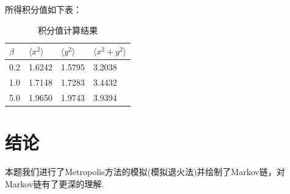 \documentclass[12pt,a4paper,utf8]{ctexart}
\begin{document}
\begin{itemize}
    所得积分值如下表：
\begin{table}[!h]
\centering
\caption{积分值计算结果}
\begin{tabular}{|l|l|l|l|}
\hline
$\beta$ & $\langle x^2\rangle$ & $\langle y^2\rangle$ & $\langle x^2+y^2\rangle$ \\ \hline
0.2     & 1.6242               & 1.5795               & 3.2038                   \\ \hline
1.0     & 1.7148               & 1.7283               & 3.4432                   \\ \hline
5.0     & 1.9650               & 1.9743               & 3.9394                   \\ \hline
\end{tabular}
\end{table}  
\end{itemize}
\section{结论}

本题我们进行了Metropolis方法的模拟(模拟退火法)并绘制了Markov链，对Markov链有了更深的理解.

\newpage
\end{document}
